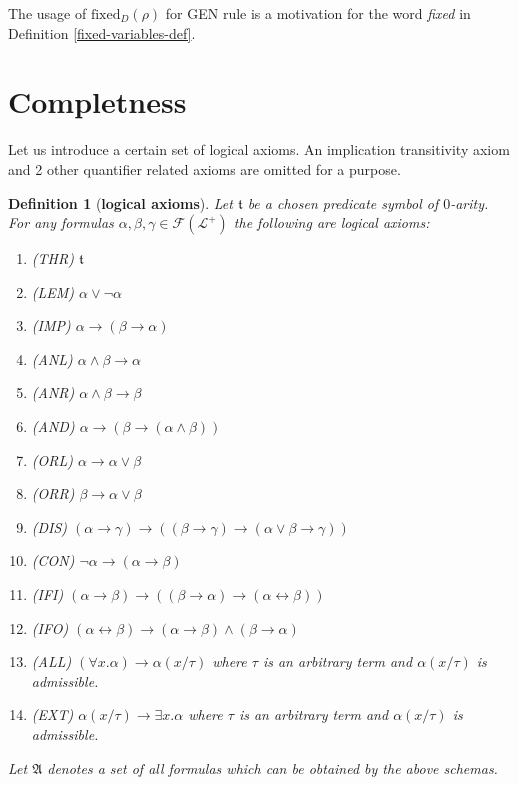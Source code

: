 \documentclass[10pt]{article}
\theoremstyle{plain}
\newtheorem{definition}[theorem]{Definition}
\newcommand{\F}{\mathcal{F}}
\newcommand{\truth}{\mathfrak{t}}
\renewcommand{\L}{\mathscr{L}}
\newcommand{\fixed}{\text{fixed}}
\begin{document}
The usage of $\fixed_D(\rho)$ for GEN rule is a motivation for the word \textit{fixed} in Definition \ref{fixed-variables-def}.

\section{Completness}
\label{completness}

Let us introduce a certain set of logical axioms. An implication transitivity axiom and 2 other quantifier related axioms are omitted for a purpose.

\begin{definition}[\textbf{logical axioms}]
\label{axioms_schemas}
Let $\truth$ be a chosen predicate symbol of $0$-arity. 
For any formulas $\alpha, \beta, \gamma\in\F(\L^+)$ the following are logical axioms:
\begin{enumerate}
\item (THR) $\truth$
\item (LEM) $\alpha \vee \neg\alpha$
\item (IMP) $\alpha \to (\beta\to\alpha)$
\item (ANL) $\alpha \wedge \beta \to \alpha$
\item (ANR) $\alpha \wedge \beta \to \beta$
\item (AND) $\alpha \to (\beta \to (\alpha \wedge \beta))$
\item (ORL) $\alpha \to \alpha \vee \beta$
\item (ORR) $\beta \to \alpha \vee \beta$
\item (DIS) $(\alpha \to \gamma) \to ((\beta \to \gamma) \to (\alpha \vee \beta \to \gamma))$
\item (CON) $\neg \alpha \to (\alpha \to \beta)$
\item (IFI) $(\alpha \to \beta)\to((\beta\to\alpha)\to(\alpha\leftrightarrow\beta))$
\item (IFO) $(\alpha\leftrightarrow\beta) \to (\alpha\to\beta) \wedge (\beta\to\alpha)$
\item (ALL) $(\forall x. \alpha) \to \alpha(x/\tau)$ where $\tau$ is an arbitrary term and $\alpha(x/\tau)$ is admissible.
\item (EXT) $\alpha(x/\tau) \to \exists x.\alpha$ where $\tau$ is an arbitrary term and $\alpha(x/\tau)$ is admissible.
\end{enumerate}

Let $\mathfrak{A}$ denotes a set of all formulas which can be obtained by the above schemas.
\end{definition}
\end{document}
